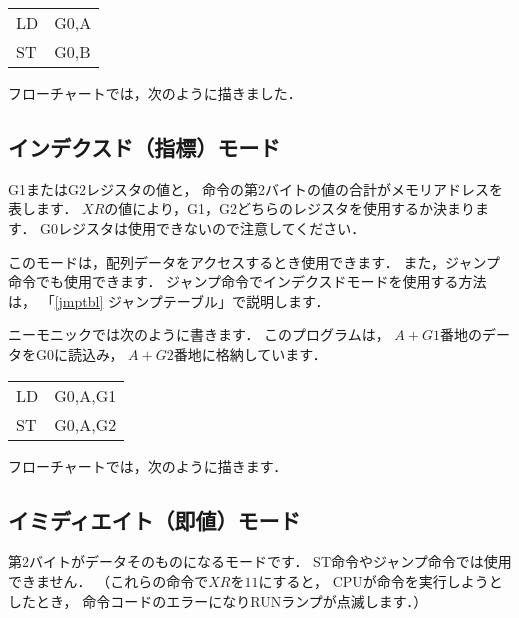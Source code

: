 {\tt\begin{center}
\begin{tabular}{l l}
LD & G0,A \\
ST & G0,B \\
\end{tabular}
\end{center}}

フローチャートでは，次のように描きました．

\begin{center}
\end{center}

\subsection{インデクスド（指標）モード}
G1またはG2レジスタの値と，
命令の第2バイトの値の合計がメモリアドレスを表します．
$XR$の値により，G1，G2どちらのレジスタを使用するか決まります．
G0レジスタは使用できないので注意してください．

このモードは，配列データをアクセスするとき使用できます．
また，ジャンプ命令でも使用できます．
ジャンプ命令でインデクスドモードを使用する方法は，
「\ref{jmptbl} ジャンプテーブル」で説明します．

ニーモニックでは次のように書きます．
このプログラムは，
$A+G1$番地のデータをG0に読込み，
$A+G2$番地に格納しています．

{\tt\begin{center}
\begin{tabular}{l l}
LD & G0,A,G1 \\
ST & G0,A,G2 \\
\end{tabular}
\end{center}}

フローチャートでは，次のように描きます．

\begin{center}
\end{center}

\subsection{イミディエイト（即値）モード}
第2バイトがデータそのものになるモードです．
ST命令やジャンプ命令では使用できません．
（これらの命令で$XR$を$11$にすると，
CPUが命令を実行しようとしたとき，
命令コードのエラーになりRUNランプが点滅します．）

